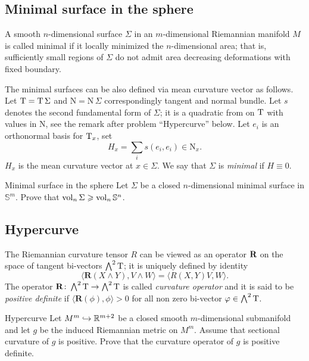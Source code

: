 \subsection*{Minimal surface in the sphere}

\label{minimal surface}
A  smooth $n$-dimensional surface $\Sigma$ in
an $m$-dimensional Riemannian manifold $M$ is called minimal
if it locally minimized the $n$-dimensional area;
that is, sufficiently small regions of $\Sigma$ do not admit area decreasing deformations with fixed boundary.

The minimal surfaces can be also defined via mean curvature vector as follows.
Let $\mathrm{T}=\mathrm{T}\,\Sigma$ and $\mathrm{N}=\mathrm{N}\,\Sigma$ correspondingly tangent and normal bundle.
Let $s$ denotes the second fundamental form of $\Sigma$;
it is a quadratic from on $\mathrm{T}$ with values in $\mathrm{N}$,
see the remark after problem ``Hypercurve'' below. 
Let  $e_i$ is an orthonormal basis for $\mathrm{T}_x$, 
set 
$$H_x=\sum_i s(e_i,e_i)\in \mathrm{N}_x.$$ 
$H_x$ is the mean curvature vector at $x\in \Sigma$. 
We say that $\Sigma$ is \emph{minimal} if $H\equiv 0$.

\begin{pr}{}{Minimal surface in the sphere}\label{almgren} 
Let $\Sigma$ be a closed $n$-dimensional 
minimal surface
in $\mathbb{S}^m$.
Prove that
$\operatorname{\rm vol}_n \Sigma\geqslant \operatorname{\rm vol}_n \mathbb{S}^n$.
\end{pr}

\subsection*{Hypercurve}

The Riemannian curvature tensor $R$
can be viewed as an operator $\text{\bf R}$ on the space of tangent bi-vectors $\bigwedge^2 \mathrm{T}$;
it is uniquely defined by identity
$$\langle\mathbf{R}(X\wedge Y),V\wedge W\rangle
=
\langle R(X,Y)V,W\rangle.$$
The operator $\mathbf{R}\colon\bigwedge^2 \mathrm{T}\to \bigwedge^2 \mathrm{T}$ is called \emph{curvature operator} and it is said to be {}\emph{positive definite} if
$\langle\mathbf{R}(\phi),\phi\rangle>0$ for all non zero
bi-vector $\varphi\in\bigwedge^2 \mathrm{T}$.


\begin{pr}{}{Hypercurve}\label{codim=2}
Let $M^m\hookrightarrow \mathbb{R}^{m+2}$ be a closed smooth $m$-dimensional
submanifold and let  $g$ be the  induced Riemannian metric on $M^m$.
Assume that sectional curvature of $g$ is positive.
Prove that the curvature operator of $g$ is positive definite.
\end{pr}

